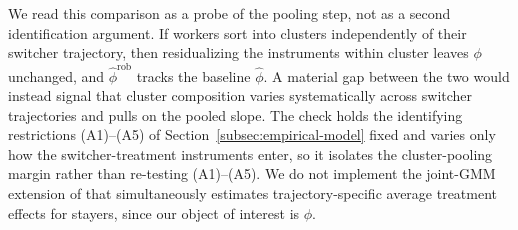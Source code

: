 We read this comparison as a probe of the pooling step, not as a second identification argument.
If workers sort into clusters independently of their switcher trajectory, then residualizing the instruments within cluster leaves $\phi$ unchanged, and $\hat\phi^{\mathrm{rob}}$ tracks the baseline $\hat\phi$.
A material gap between the two would instead signal that cluster composition varies systematically across switcher trajectories and pulls on the pooled slope.
The check holds the identifying restrictions (A1)--(A5) of Section~\ref{subsec:empirical-model} fixed and varies only how the switcher-treatment instruments enter, so it isolates the cluster-pooling margin rather than re-testing (A1)--(A5).
We do not implement the joint-GMM extension of \citet{verdierAverageTreatmentEffects2020a} that simultaneously estimates trajectory-specific average treatment effects for stayers, since our object of interest is $\phi$.






\FloatBarrier
